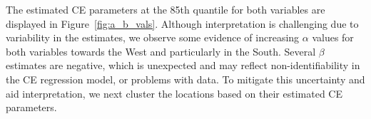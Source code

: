\documentclass[
  12pt]{article}
\DeclareMathOperator{\CE}{\mathrm{CE}}
\begin{document}

The estimated CE parameters at the 85th quantile for both variables are displayed in Figure~\ref{fig:a_b_vals}.  
Although interpretation is challenging due to variability in the estimates, we observe some evidence of increasing $\alpha$ values for both variables towards the West and particularly in the South.  
Several $\beta$ estimates are negative, which is unexpected and may reflect non-identifiability in the CE regression model, or problems with data. 
To mitigate this uncertainty and aid interpretation, we next cluster the locations based on their estimated CE parameters.  
\end{document}
